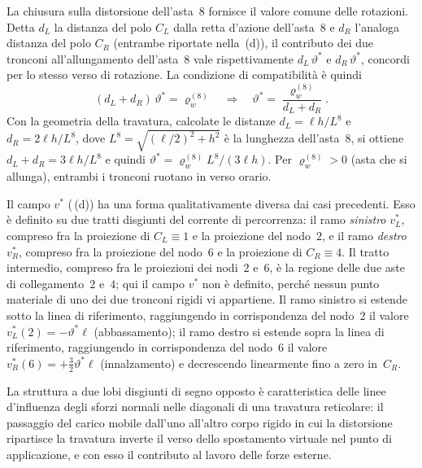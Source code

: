 \begin{esempio}
\begin{svolgimento}
		La chiusura sulla distorsione dell'asta~$8$ fornisce il valore
		comune delle rotazioni. Detta $d_L$ la distanza del polo $C_L$
		dalla retta d'azione dell'asta~$8$ e $d_R$ l'analoga distanza del
		polo $C_R$ (entrambe riportate nella
		\,(d)), il contributo dei due
		tronconi all'allungamento dell'asta~$8$ vale rispettivamente
		$d_L\,\vartheta^*$ e $d_R\,\vartheta^*$, concordi per lo stesso
		verso di rotazione. La condizione di compatibilità è quindi
		\begin{equation*}
			(d_L + d_R)\,\vartheta^* = \varrho_w^{(8)}
			\quad\Longrightarrow\quad
			\vartheta^* = \frac{\varrho_w^{(8)}}{d_L + d_R}.
		\end{equation*}
		Con la geometria della travatura, calcolate le distanze
		$d_L = \ell h/L^{8}$ e $d_R = 2\ell h/L^{8}$, dove
		$L^{8} = \sqrt{(\ell/2)^2 + h^2}$ è la lunghezza dell'asta~$8$, si
		ottiene $d_L+d_R = 3\ell h/L^{8}$ e quindi
		$\vartheta^* = \varrho_w^{(8)} L^{8}/(3\ell h)$. Per $\varrho_w^{(8)}>0$ (asta che si allunga), entrambi i tronconi
		ruotano in verso orario.
		
		Il campo $v^*$ (\,(d)) ha una forma
		qualitativamente diversa dai casi precedenti. Esso è definito su
		due tratti disgiunti del corrente di percorrenza: il ramo
		\emph{sinistro} $v^*_L$, compreso fra la proiezione di $C_L\equiv 1$
		e la proiezione del nodo~$2$, e il ramo \emph{destro} $v^*_R$,
		compreso fra la proiezione del nodo~$6$ e la proiezione di
		$C_R\equiv 4$. Il tratto intermedio, compreso fra le proiezioni
		dei nodi~$2$ e~$6$, è la regione delle due aste di collegamento~$2$
		e~$4$; qui il campo $v^*$ non è definito, perché nessun punto
		materiale di uno dei due tronconi rigidi vi appartiene. Il ramo
		sinistro si estende sotto la linea di riferimento, raggiungendo in
		corrispondenza del nodo~$2$ il valore $v^*_L(2)=-\vartheta^*\ell$
		(abbassamento); il ramo destro si estende sopra la linea di
		riferimento, raggiungendo in corrispondenza del nodo~$6$ il valore
		$v^*_R(6)=+\tfrac{3}{2}\vartheta^*\ell$ (innalzamento) e decrescendo
		linearmente fino a zero in~$C_R$.
		
		La struttura a due lobi disgiunti di segno opposto è caratteristica
		delle linee d'influenza degli sforzi normali nelle diagonali di
		una travatura reticolare: il passaggio del carico mobile dall'uno
		all'altro corpo rigido in cui la distorsione ripartisce la
		travatura inverte il verso dello spostamento virtuale nel punto di
		applicazione, e con esso il contributo al lavoro delle forze
		esterne.
		

\end{svolgimento}
\end{esempio}
